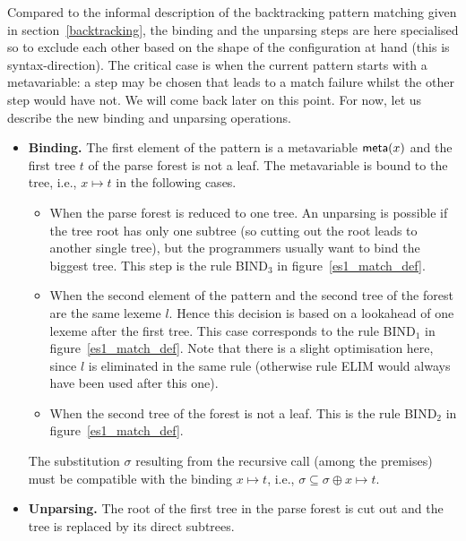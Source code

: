 Compared to the informal description of the backtracking pattern
matching given in section~\ref{backtracking}, the binding and the
unparsing steps are here specialised so to exclude each other based on
the shape of the configuration at hand (this is
syntax\hyp{}direction). The critical case is when the current pattern
starts with a meta\-variable: a step may be chosen that leads to a
match failure whilst the other step would have not. We will come back
later on this point. For now, let us describe the new binding and
unparsing operations.
\begin{itemize}

  \item \textbf{Binding.} The first element of the pattern is a
    meta\-variable \(\textsf{meta}(x)\) and the first tree \(t\) of the parse
    forest is not a leaf. The meta\-variable is bound to the tree,
    i.e., \(x \mapsto t\) in the following cases.
    \begin{itemize}

      \item When the parse forest is reduced to one tree. An unparsing
      is possible if the tree root has only one subtree (so cutting
      out the root leads to another single tree), but the programmers
      usually want to bind the biggest tree. This step is the rule
      \textsf{BIND}\(_3\) in figure~\ref{es1_match_def}.

      \item When the second element of the pattern and the second tree
      of the forest are the same lexeme \(l\). Hence this decision is
      based on a lookahead of one lexeme after the first tree. This
      case corresponds to the rule \textsf{BIND}\(_1\) in
      figure~\ref{es1_match_def}. Note that there is a slight
      optimisation here, since \(l\) is eliminated in the same rule
      (otherwise rule \textsf{ELIM} would always have been used after
      this one).

      \item When the second tree of the forest is not a leaf. This is
      the rule \textsf{BIND}\(_2\) in figure~\ref{es1_match_def}.

    \end{itemize}
    The substitution \(\sigma\) resulting from the recursive call
    (among the premises) must be compatible with the binding \(x
    \mapsto t\), i.e., \(\sigma \subseteq \sigma \oplus x \mapsto t\).

  \item \textbf{Unparsing.} The root of the first tree in the parse
  forest is cut out and the tree is replaced by its direct
  subtrees.
    \begin{itemize}


\end{itemize}
\end{itemize}
